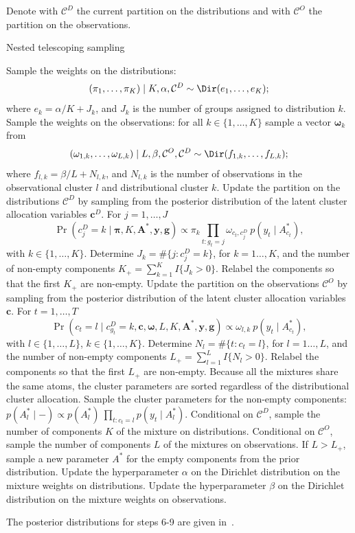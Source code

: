 \begin{algorithm}
	Denote with $\mathcal{C}^D$ the current partition on the distributions and with $\mathcal{C}^O$ the partition on the observations.
	\caption{Nested telescoping sampling}\label{ch3_alg:nested_telescopic}
	\begin{algorithmic}[1]
		\State Sample the weights on the distributions: $$(\pi_1,\dots,\pi_K)\mid K, \alpha, \mathcal{C}^D \sim \Dir(e_1, \dots, e_K);$$ where $e_k = \alpha/K + J_k$, and $J_k$ is the number of groups assigned to distribution $k$.
		\State Sample the weights on the observations: for all $k\in\{1,\dots,K\}$ sample a vector $\bm{\omega}_k$ from
		$$(\omega_{1,k},\dots,\omega_{L,k})\mid L, \beta, \mathcal{C}^O, \mathcal{C}^D \sim \Dir(f_{1,k}, \dots, f_{L,k});$$ where $f_{l,k} = \beta/L + N_{l,k}$, and $N_{l,k}$ is the number of observations in the observational cluster $l$ and distributional cluster $k$.
		\State Update the partition on the distributions $\mathcal{C}^D$ by sampling from the posterior distribution of the latent cluster allocation variables $\bm{c}^D$. For $j = 1,\dots,J$
		$$\Pr(c^D_j = k\mid \bm{\pi}, K,\bm{A}^*, \bm{y}, \bm{g}) \propto \pi_k \prod_{t:g_t=j} \omega_{c_t,c^D_j} \: p(y_t\mid A^*_{c_t}),$$
		with $k\in\{1,\dots,K\}$.
		Determine $J_k = \#\{j:c^D_j = k\}$, for $k=1\dots,K$, and the number of non-empty components $K_+ = \sum_{k=1}^K I\{ J_k > 0\}$. Relabel the components so that the first $K_+$ are non-empty.
		\State Update the partition on the observations $\mathcal{C}^O$ by sampling from the posterior distribution of the latent cluster allocation variables $\bm{c}$. For $t = 1,\dots,T$
		$$\Pr(c_t = l \mid c^D_{g_t}= k, \bm{c},\bm{\omega}, L,K,\bm{A}^*, \bm{y}, \bm{g}) \propto \omega_{l,k} \: p(y_t\mid A^*_{c_t}),$$
		with $l\in\{1,\dots,L\}$, $k\in\{1,\dots,K\}$.
		Determine $N_l = \#\{t:c_t = l\}$, for $l=1\dots,L$, and the number of non-empty components $L_+ = \sum_{l=1}^L I\{ N_l > 0\}$. Relabel the components so that the first $L_+$ are non-empty. Because all the mixtures share the same atoms, the cluster parameters are sorted regardless of the distributional cluster allocation.
		\State Sample the cluster parameters for the non-empty components: $ p(A^*_l\mid -)\propto p(A^*_l)\: \prod_{t:c_t = l} p(y_t\mid A^*_l) $.
		\State Conditional on $\mathcal{C}^D$, sample the number of components $K$ of the mixture on distributions.
		\State Conditional on $\mathcal{C}^O$, sample the number of components $L$ of the mixtures on observations. If $L > L_+$, sample a new parameter $A^*$ for the empty components from the prior distribution.
		\State Update the hyperparameter $\alpha$ on the Dirichlet distribution on the mixture weights on distributions.
		\State Update the hyperparameter $\beta$ on the Dirichlet distribution on the mixture weights on observations.
	\end{algorithmic}
The posterior distributions for steps 6-9 are given in~\textcite{fruhwirthschnatter2020}.
\end{algorithm}


